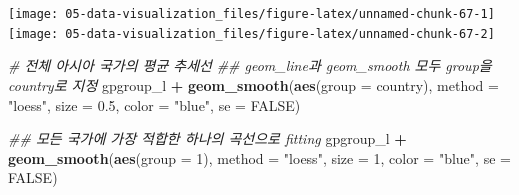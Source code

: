 \documentclass[
  11pt,
]{krantz}
\newenvironment{Shaded}{\begin{snugshade}}{\end{snugshade}}
\newcommand{\CommentTok}[1]{\textcolor[rgb]{0.37,0.37,0.37}{\textit{#1}}}
\newcommand{\DataTypeTok}[1]{\textcolor[rgb]{0.27,0.27,0.27}{#1}}
\newcommand{\DecValTok}[1]{\textcolor[rgb]{0.06,0.06,0.06}{#1}}
\newcommand{\FloatTok}[1]{\textcolor[rgb]{0.06,0.06,0.06}{#1}}
\newcommand{\KeywordTok}[1]{\textcolor[rgb]{0.27,0.27,0.27}{\textbf{#1}}}
\newcommand{\NormalTok}[1]{#1}
\newcommand{\OperatorTok}[1]{\textcolor[rgb]{0.43,0.43,0.43}{\textbf{#1}}}
\newcommand{\OtherTok}[1]{\textcolor[rgb]{0.37,0.37,0.37}{#1}}
\newcommand{\StringTok}[1]{\textcolor[rgb]{0.5,0.5,0.5}{#1}}
\begin{document}
\begin{Shaded}
\end{Shaded}

\texttt{[image: 05-data-visualization\_files/figure-latex/unnamed-chunk-67-1]} \texttt{[image: 05-data-visualization\_files/figure-latex/unnamed-chunk-67-2]}

\normalsize

\footnotesize

\begin{Shaded}
\begin{Highlighting}[]
\CommentTok{# 전체 아시아 국가의 평균 추세선 }
\CommentTok{## geom_line과 geom_smooth 모두 group을 country로 지정}
\NormalTok{gpgroup_l }\OperatorTok{+}\StringTok{ }
\StringTok{  }\KeywordTok{geom_smooth}\NormalTok{(}\KeywordTok{aes}\NormalTok{(}\DataTypeTok{group =}\NormalTok{ country), }
              \DataTypeTok{method =} \StringTok{"loess"}\NormalTok{, }
              \DataTypeTok{size =} \FloatTok{0.5}\NormalTok{, }
              \DataTypeTok{color =} \StringTok{"blue"}\NormalTok{, }
              \DataTypeTok{se =} \OtherTok{FALSE}\NormalTok{)}

\CommentTok{## 모든 국가에 가장 적합한 하나의 곡선으로 fitting}
\NormalTok{gpgroup_l }\OperatorTok{+}\StringTok{ }
\StringTok{  }\KeywordTok{geom_smooth}\NormalTok{(}\KeywordTok{aes}\NormalTok{(}\DataTypeTok{group =} \DecValTok{1}\NormalTok{), }
              \DataTypeTok{method =} \StringTok{"loess"}\NormalTok{, }
              \DataTypeTok{size =} \DecValTok{1}\NormalTok{, }
              \DataTypeTok{color =} \StringTok{"blue"}\NormalTok{, }
              \DataTypeTok{se =} \OtherTok{FALSE}\NormalTok{)}
\end{Highlighting}
\end{Shaded}
\end{document}
